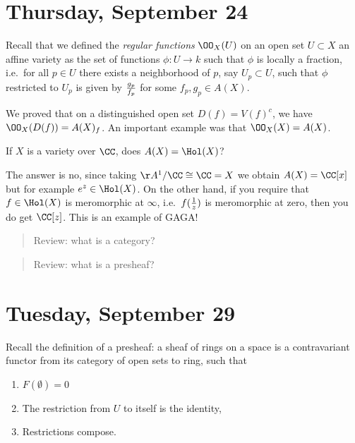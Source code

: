 \hypertarget{thursday-september-24}{%
\section{Thursday, September 24}\label{thursday-september-24}}

Recall that we defined the \emph{regular functions} \(\OO_X(U)\) on an
open set \(U\subset X\) an affine variety as the set of functions
\(\phi: U\to k\) such that \(\phi\) is locally a fraction, i.e.~for all
\(p\in U\) there exists a neighborhood of \(p\), say \(U_p \subset U\),
such that \(\phi\) restricted to \(U_p\) is given by \(g_p \over f_p\)
for some \(f_p, g_p \in A(X)\).

We proved that on a distinguished open set \(D(f) = V(f)^c\), we have
\(\OO_X(D(f)) = A(X)_f\). An important example was that
\(\OO_X(X) = A(X)\).

\begin{question}

If \(X\) is a variety over \(\CC\), does \(A(X) = \Hol(X)\)?

\end{question}

\begin{answer}

The answer is no, since taking \(\AA^1/\CC \cong \CC = X\) we obtain
\(A(X) = \CC[x]\) but for example \(e^z \in \Hol(X)\). On the other
hand, if you require that \(f\in \Hol(X)\) is meromorphic at \(\infty\),
i.e.~\(f({1\over z})\) is meromorphic at zero, then you do get
\(\CC[z]\). This is an example of GAGA!

\end{answer}

\begin{quote}
Review: what is a category?
\end{quote}

\begin{quote}
Review: what is a presheaf?
\end{quote}

\hypertarget{tuesday-september-29}{%
\section{Tuesday, September 29}\label{tuesday-september-29}}

Recall the definition of a presheaf: a sheaf of rings on a space is a
contravariant functor from its category of open sets to ring, such that

\begin{enumerate}
\def\labelenumi{\arabic{enumi}.}
\tightlist
\item
  \(F(\emptyset) = 0\)
\item
  The restriction from \(U\) to itself is the identity,
\item
  Restrictions compose.
\end{enumerate}

